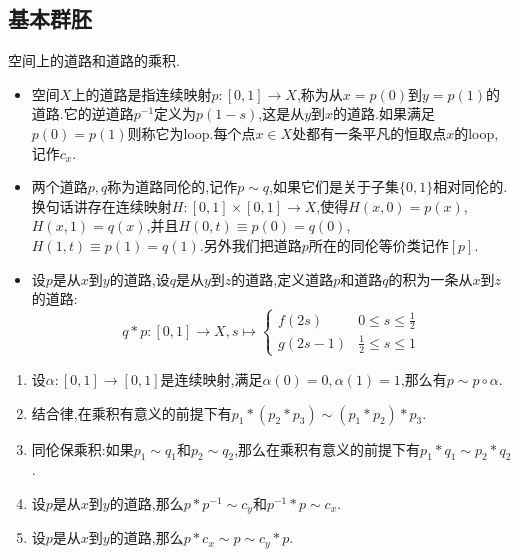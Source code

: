 \subsection{基本群胚}

空间上的道路和道路的乘积.
\begin{itemize}
	\item 空间$X$上的道路是指连续映射$p:[0,1]\to X$,称为从$x=p(0)$到$y=p(1)$的道路.它的逆道路$p^{-1}$定义为$p(1-s)$,这是从$y$到$x$的道路.如果满足$p(0)=p(1)$则称它为loop.每个点$x\in X$处都有一条平凡的恒取点$x$的loop,记作$c_x$.
	\item 两个道路$p,q$称为道路同伦的,记作$p\sim q$,如果它们是关于子集$\{0,1\}$相对同伦的.换句话讲存在连续映射$H:[0,1]\times[0,1]\to X$,使得$H(x,0)=p(x)$,$H(x,1)=q(x)$,并且$H(0,t)\equiv p(0)=q(0)$,$H(1,t)\equiv p(1)=q(1)$.另外我们把道路$p$所在的同伦等价类记作$[p]$.
	\item 设$p$是从$x$到$y$的道路,设$q$是从$y$到$z$的道路,定义道路$p$和道路$q$的积为一条从$x$到$z$的道路:
	$$q\ast p:[0,1]\to X,s\mapsto\left\{\begin{array}{cc}f(2s)&0\le s\le\frac{1}{2}\\g(2s-1)&\frac{1}{2}\le s\le1\end{array}\right.$$
\end{itemize}
\begin{enumerate}
	\item 设$\alpha:[0,1]\to[0,1]$是连续映射,满足$\alpha(0)=0,\alpha(1)=1$,那么有$p\sim p\circ\alpha$.
	\item 结合律,在乘积有意义的前提下有$p_1\ast(p_2\ast p_3)\sim(p_1\ast p_2)\ast p_3$.
	\item 同伦保乘积:如果$p_1\sim q_1$和$p_2\sim q_2$,那么在乘积有意义的前提下有$p_1\ast q_1\sim p_2\ast q_2$.
	\item 设$p$是从$x$到$y$的道路,那么$p\ast p^{-1}\sim c_y$和$p^{-1}\ast p\sim c_x$.
	\item 设$p$是从$x$到$y$的道路,那么$p\ast c_x\sim p\sim c_y\ast p$.
\end{enumerate}

